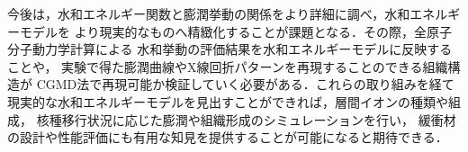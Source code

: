 ﻿\documentclass[11pt,a4j]{jarticle}
\begin{document}
今後は，水和エネルギー関数と膨潤挙動の関係をより詳細に調べ，水和エネルギーモデルを
より現実的なものへ精緻化することが課題となる．その際，全原子分子動力学計算による
水和挙動の評価結果を水和エネルギーモデルに反映することや，
実験で得た膨潤曲線やX線回折パターンを再現することのできる組織構造が
CGMD法で再現可能か検証していく必要がある．これらの取り組みを経て
現実的な水和エネルギーモデルを見出すことができれば，層間イオンの種類や組成，
核種移行状況に応じた膨潤や組織形成のシミュレーションを行い，
緩衝材の設計や性能評価にも有用な知見を提供することが可能になると期待できる．
%
\end{document}
